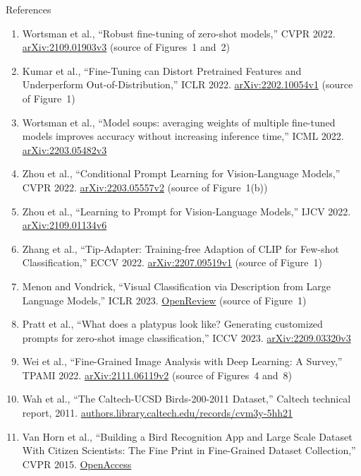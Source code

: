 \begin{frame}[allowframebreaks]{References}
  \scriptsize
  \setlength{\parskip}{0pt}
  \begin{enumerate}\itemsep0.15em
    \item Wortsman et al., ``Robust fine-tuning of zero-shot models,'' CVPR 2022. \href{https://arxiv.org/abs/2109.01903v3}{arXiv:2109.01903v3} (source of Figures~1 and~2)
    \item Kumar et al., ``Fine-Tuning can Distort Pretrained Features and Underperform Out-of-Distribution,'' ICLR 2022. \href{https://arxiv.org/abs/2202.10054v1}{arXiv:2202.10054v1} (source of Figure~1)
    \item Wortsman et al., ``Model soups: averaging weights of multiple fine-tuned models improves accuracy without increasing inference time,'' ICML 2022. \href{https://arxiv.org/abs/2203.05482v3}{arXiv:2203.05482v3}
    \item Zhou et al., ``Conditional Prompt Learning for Vision-Language Models,'' CVPR 2022. \href{https://arxiv.org/abs/2203.05557v2}{arXiv:2203.05557v2} (source of Figure~1(b))
    \item Zhou et al., ``Learning to Prompt for Vision-Language Models,'' IJCV 2022. \href{https://arxiv.org/abs/2109.01134v6}{arXiv:2109.01134v6}
    \item Zhang et al., ``Tip-Adapter: Training-free Adaption of CLIP for Few-shot Classification,'' ECCV 2022. \href{https://arxiv.org/abs/2207.09519v1}{arXiv:2207.09519v1} (source of Figure~1)
    \item Menon and Vondrick, ``Visual Classification via Description from Large Language Models,'' ICLR 2023. \href{https://openreview.net/forum?id=jlAjNL8z5cs}{OpenReview} (source of Figure~1)
    \item Pratt et al., ``What does a platypus look like? Generating customized prompts for zero-shot image classification,'' ICCV 2023. \href{https://arxiv.org/abs/2209.03320v3}{arXiv:2209.03320v3}
    \item Wei et al., ``Fine-Grained Image Analysis with Deep Learning: A Survey,'' TPAMI 2022. \href{https://arxiv.org/abs/2111.06119v2}{arXiv:2111.06119v2} (source of Figures~4 and~8)
    \item Wah et al., ``The Caltech-UCSD Birds-200-2011 Dataset,'' Caltech technical report, 2011. \href{https://authors.library.caltech.edu/records/cvm3y-5hh21}{authors.library.caltech.edu/records/cvm3y-5hh21}
    \item Van Horn et al., ``Building a Bird Recognition App and Large Scale Dataset With Citizen Scientists: The Fine Print in Fine-Grained Dataset Collection,'' CVPR 2015. \href{https://openaccess.thecvf.com/content_cvpr_2015/html/Horn_Building_a_Bird_2015_CVPR_paper.html}{OpenAccess}

\end{enumerate}
\end{frame}

